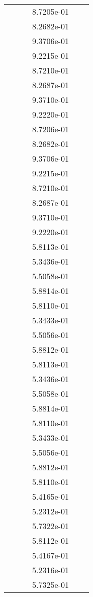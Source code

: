 \begin{xltabular}{\textwidth}{r|rS[table-format=1.3e+2]S[table-format=1.4e+2]S[table-format=1.4e+2]S[table-format=-1.5]}
&  &  & 8.7205e-01 & & \\
&  &  & 8.2682e-01 & & \\
&  &  & 9.3706e-01 & & \\
&  &  & 9.2215e-01 & & \\
&  &  & 8.7210e-01 & & \\
&  &  & 8.2687e-01 & & \\
&  &  & 9.3710e-01 & & \\
&  &  & 9.2220e-01 & & \\
&  &  & 8.7206e-01 & & \\
&  &  & 8.2682e-01 & & \\
&  &  & 9.3706e-01 & & \\
&  &  & 9.2215e-01 & & \\
&  &  & 8.7210e-01 & & \\
&  &  & 8.2687e-01 & & \\
&  &  & 9.3710e-01 & & \\
&  &  & 9.2220e-01 & & \\
&  &  & 5.8113e-01 & & \\
&  &  & 5.3436e-01 & & \\
&  &  & 5.5058e-01 & & \\
&  &  & 5.8814e-01 & & \\
&  &  & 5.8110e-01 & & \\
&  &  & 5.3433e-01 & & \\
&  &  & 5.5056e-01 & & \\
&  &  & 5.8812e-01 & & \\
&  &  & 5.8113e-01 & & \\
&  &  & 5.3436e-01 & & \\
&  &  & 5.5058e-01 & & \\
&  &  & 5.8814e-01 & & \\
&  &  & 5.8110e-01 & & \\
&  &  & 5.3433e-01 & & \\
&  &  & 5.5056e-01 & & \\
&  &  & 5.8812e-01 & & \\
&  &  & 5.8110e-01 & & \\
&  &  & 5.4165e-01 & & \\
&  &  & 5.2312e-01 & & \\
&  &  & 5.7322e-01 & & \\
&  &  & 5.8112e-01 & & \\
&  &  & 5.4167e-01 & & \\
&  &  & 5.2316e-01 & & \\
&  &  & 5.7325e-01 & & \\

\end{xltabular}
